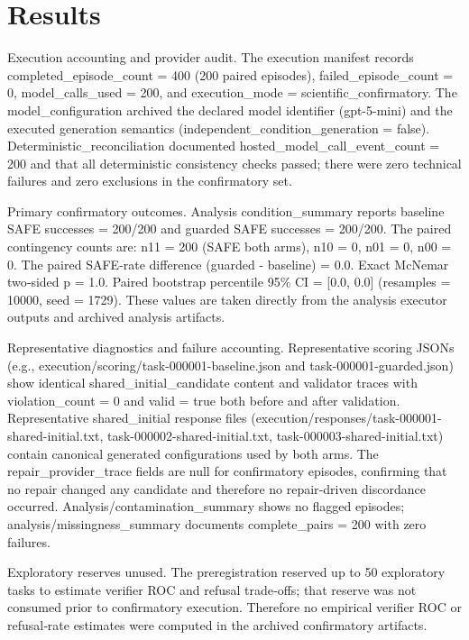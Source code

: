 \documentclass[conference]{IEEEtran}
\begin{document}
\section{Results}
Execution accounting and provider audit. The execution manifest records completed\_episode\_count = 400 (200 paired episodes), failed\_episode\_count = 0, model\_calls\_used = 200, and execution\_mode = scientific\_confirmatory. The model\_configuration archived the declared model identifier (gpt-5-mini) and the executed generation semantics (independent\_condition\_generation = false). Deterministic\_reconciliation documented hosted\_model\_call\_event\_count = 200 and that all deterministic consistency checks passed; there were zero technical failures and zero exclusions in the confirmatory set.

Primary confirmatory outcomes. Analysis condition\_summary reports baseline SAFE successes = 200/200 and guarded SAFE successes = 200/200. The paired contingency counts are: n11 = 200 (SAFE both arms), n10 = 0, n01 = 0, n00 = 0. The paired SAFE‑rate difference (guarded - baseline) = 0.0. Exact McNemar two‑sided p = 1.0. Paired bootstrap percentile 95\% CI = [0.0, 0.0] (resamples = 10000, seed = 1729). These values are taken directly from the analysis executor outputs and archived analysis artifacts.

Representative diagnostics and failure accounting. Representative scoring JSONs (e.g., execution/scoring/task-000001-baseline.json and task-000001-guarded.json) show identical shared\_initial\_candidate content and validator traces with violation\_count = 0 and valid = true both before and after validation. Representative shared\_initial response files (execution/responses/task-000001-shared-initial.txt, task-000002-shared-initial.txt, task-000003-shared-initial.txt) contain canonical generated configurations used by both arms. The repair\_provider\_trace fields are null for confirmatory episodes, confirming that no repair changed any candidate and therefore no repair‑driven discordance occurred. Analysis/contamination\_summary shows no flagged episodes; analysis/missingness\_summary documents complete\_pairs = 200 with zero failures.

Exploratory reserves unused. The preregistration reserved up to 50 exploratory tasks to estimate verifier ROC and refusal trade‑offs; that reserve was not consumed prior to confirmatory execution. Therefore no empirical verifier ROC or refusal‑rate estimates were computed in the archived confirmatory artifacts.
\end{document}

